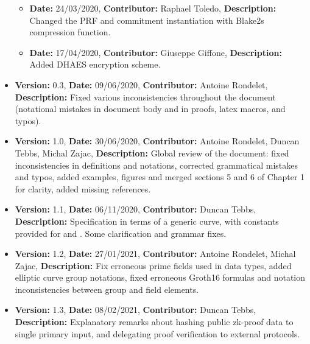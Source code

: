 \begin{itemize}
\begin{itemize}
            \item \textbf{Date:} 24/03/2020, \textbf{Contributor:} Raphael Toledo, \textbf{Description:} Changed the PRF and commitment instantiation with Blake2s compression function.
            \item \textbf{Date:} 17/04/2020, \textbf{Contributor:} Giuseppe Giffone, \textbf{Description:} Added DHAES encryption scheme.
        \end{itemize}
    \item \textbf{Version:} 0.3, \textbf{Date:} 09/06/2020, \textbf{Contributor:} Antoine Rondelet, \textbf{Description:} Fixed various inconsistencies throughout the document (notational mistakes in document body and in proofs, latex macros, and typos).
    \item \textbf{Version:} 1.0, \textbf{Date:} 30/06/2020, \textbf{Contributor:} Antoine Rondelet, Duncan Tebbs, Michal Zajac, \textbf{Description:} Global review of the document: fixed inconsistencies in definitions and notations, corrected grammatical mistakes and typos, added examples, figures and merged sections 5 and 6 of Chapter 1 for clarity, added missing references.
    \item \textbf{Version:} 1.1, \textbf{Date:} 06/11/2020, \textbf{Contributor:} Duncan Tebbs, \textbf{Description:} Specification in terms of a generic curve, with constants provided for \BNCurve and \BLSCurve. Some clarification and grammar fixes.
    \item \textbf{Version:} 1.2, \textbf{Date:} 27/01/2021, \textbf{Contributor:} Antoine Rondelet, Michal Zajac, \textbf{Description:} Fix erroneous prime fields used in data types, added elliptic curve group notations, fixed erroneous Groth16 formulas and notation inconsistencies between group and field elements.
    \item \textbf{Version:} 1.3, \textbf{Date:} 08/02/2021, \textbf{Contributor:} Duncan Tebbs, \textbf{Description:} Explanatory remarks about hashing public zk-proof data to single primary input, and delegating proof verification to external protocols.
\end{itemize}
